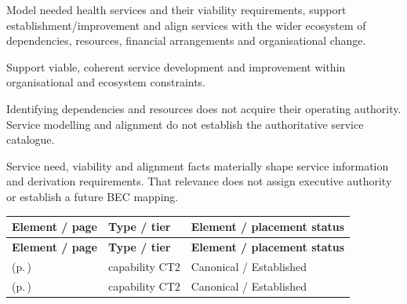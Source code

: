 
Model needed health services and their viability requirements, support establishment/\allowbreak{}improvement and align services with the wider ecosystem of dependencies, resources, financial arrangements and organisational change.



Support viable, coherent service development and improvement within organisational and ecosystem constraints.



Identifying dependencies and resources does not acquire their operating authority. Service modelling and alignment do not establish the authoritative service catalogue.



Service need, viability and alignment facts materially shape service information and derivation requirements. That relevance does not assign executive authority or establish a future BEC mapping.


\begingroup\small\setlength{\TableWidth}{\dimexpr\linewidth-6\tabcolsep-4\arrayrulewidth\relax}
\begin{longtable}{|>{\raggedright\arraybackslash}p{0.52\TableWidth}|>{\raggedright\arraybackslash}p{0.2\TableWidth}|>{\raggedright\arraybackslash}p{0.28\TableWidth}|}
\hline\rowcolor{TableHead}\textbf{Element / page} & \textbf{Type / tier} & \textbf{Element / placement status}\\\hline\endfirsthead
\hline\rowcolor{TableHead}\textbf{Element / page} & \textbf{Type / tier} & \textbf{Element / placement status}\\\hline\endhead
\hline\endfoot
\nameref{cap:bc-health-service-modelling} (p.\,\pageref{cap:bc-health-service-modelling}) & capability CT2 & Canonical / Established\\\hline
\nameref{cap:bc-health-service-alignment} (p.\,\pageref{cap:bc-health-service-alignment}) & capability CT2 & Canonical / Established\\\hline
\end{longtable}\endgroup

